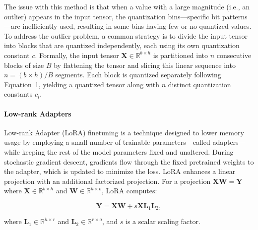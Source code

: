 The issue with this method is that when a value with a large magnitude (i.e., an outlier) appears in the input tensor, the quantization bins—specific bit patterns—are inefficiently used, resulting in some bins having few or no quantized values. To address the outlier problem, a common strategy is to divide the input tensor into blocks that are quantized independently, each using its own quantization constant $c$. Formally, the input tensor $\mathbf{X}\in \mathbb{R}^{b\times h}$ is partitioned into $n$ consecutive blocks of size $B$ by flattening the tensor and slicing this linear sequence into ${n = ({b\times h} )/{B}}$ segments. Each block is quantized separately following Equation~1, yielding a quantized tensor along with $n$ distinct quantization constants $c_i$.

\paragraph{Low-rank Adapters} Low-rank Adapter (LoRA) finetuning \citep{hu2021lora} is a technique designed to lower memory usage by employing a small number of trainable parameters—called adapters—while keeping the rest of the model parameters fixed and unaltered. During stochastic gradient descent, gradients flow through the fixed pretrained weights to the adapter, which is updated to minimize the loss. LoRA enhances a linear projection with an additional factorized projection. For a projection ${\mathbf{X} \mathbf{W} = \mathbf{Y}}$ where $\mathbf{X}\in  \mathbb{R}^{b\times h}$ and $\mathbf{W}\in  \mathbb{R}^{h\times o}$, LoRA computes:

\begin{equation}
    \mathbf{Y} = \mathbf{X}\mathbf{W} + s\mathbf{X}\mathbf{L}_1\mathbf{L}_2,
\end{equation}

where $\mathbf{L}_1\in  \mathbb{R}^{h\times r}$ and $\mathbf{L}_2\in  \mathbb{R}^{r\times o}$, and $s$ is a scalar scaling factor.

